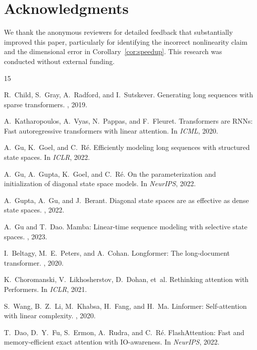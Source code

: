\documentclass{article}
\begin{document}
\section*{Acknowledgments}
We thank the anonymous reviewers for detailed feedback that substantially improved this paper, particularly for identifying the incorrect nonlinearity claim and the dimensional error in Corollary~\ref{cor:speedup}. This research was conducted without external funding.



\begin{thebibliography}{15}

R.~Child, S.~Gray, A.~Radford, and I.~Sutskever.
\newblock Generating long sequences with sparse transformers.
, 2019.

A.~Katharopoulos, A.~Vyas, N.~Pappas, and F.~Fleuret.
\newblock Transformers are {RNN}s: Fast autoregressive transformers with linear attention.
\newblock In {\em ICML}, 2020.

A.~Gu, K.~Goel, and C.~R\'{e}.
\newblock Efficiently modeling long sequences with structured state spaces.
\newblock In {\em ICLR}, 2022.

A.~Gu, A.~Gupta, K.~Goel, and C.~R\'{e}.
\newblock On the parameterization and initialization of diagonal state space models.
\newblock In {\em NeurIPS}, 2022.

A.~Gupta, A.~Gu, and J.~Berant.
\newblock Diagonal state spaces are as effective as dense state spaces.
, 2022.

A.~Gu and T.~Dao.
\newblock Mamba: Linear-time sequence modeling with selective state spaces.
, 2023.

I.~Beltagy, M.~E.~Peters, and A.~Cohan.
\newblock Longformer: The long-document transformer.
, 2020.

K.~Choromanski, V.~Likhosherstov, D.~Dohan, et~al.
\newblock Rethinking attention with {P}erformers.
\newblock In {\em ICLR}, 2021.

S.~Wang, B.~Z.~Li, M.~Khabsa, H.~Fang, and H.~Ma.
\newblock Linformer: Self-attention with linear complexity.
, 2020.

T.~Dao, D.~Y.~Fu, S.~Ermon, A.~Rudra, and C.~R\'{e}.
\newblock Flash{A}ttention: Fast and memory-efficient exact attention with {IO}-awareness.
\newblock In {\em NeurIPS}, 2022.


\end{thebibliography}
\end{document}
